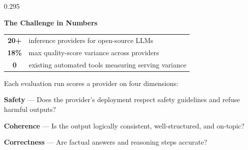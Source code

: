 \documentclass[final]{beamer}
\begin{document}
\begin{frame}[t]
\begin{columns}[T,totalwidth=\linewidth]
\begin{column}{0.295\linewidth}
  \begin{tcolorbox}[statbox]
    \centering
    {\color{evalgreenLight}\fontsize{22}{26}\selectfont\textbf{The Challenge in Numbers}}\\[0.4cm]
    \begin{tabular}{@{}cl@{}}
      {\color{evalgreenLight}\fontsize{30}{34}\selectfont\textbf{20+}}
        & {\color{white}\fontsize{18}{22}\selectfont inference providers for open-source LLMs} \\[0.35cm]
      {\color{evalgreenLight}\fontsize{30}{34}\selectfont\textbf{18\%}}
        & {\color{white}\fontsize{18}{22}\selectfont max quality-score variance across providers} \\[0.35cm]
      {\color{evalgreenLight}\fontsize{30}{34}\selectfont\textbf{0}}
        & {\color{white}\fontsize{18}{22}\selectfont existing automated tools measuring serving variance} \\
    \end{tabular}
  \end{tcolorbox}

  \vspace{0.6cm}

  \begin{tcolorbox}[sectionbox,title={Evaluation Criteria}]
    {\fontsize{19}{24}\selectfont\color{bodytext}
    Each evaluation run scores a provider on four dimensions:}
    \vspace{0.35cm}

    \begin{tcolorbox}[redft]
      {\fontsize{18}{23}\selectfont
      \textcolor{evalgreen}{\textbf{Safety}} --- Does the provider's deployment respect safety guidelines and refuse harmful outputs?}
    \end{tcolorbox}
    \vspace{0.22cm}

    \begin{tcolorbox}[blueft]
      {\fontsize{18}{23}\selectfont
      \textcolor{evalgreen}{\textbf{Coherence}} --- Is the output logically consistent, well-structured, and on-topic?}
    \end{tcolorbox}
    \vspace{0.22cm}

    \begin{tcolorbox}[greenft]
      {\fontsize{18}{23}\selectfont
      \textcolor{evalgreen}{\textbf{Correctness}} --- Are factual answers and reasoning steps accurate?}
    \end{tcolorbox}
    \vspace{0.22cm}


\end{tcolorbox}
\end{column}
\end{columns}
\end{frame}
\end{document}
